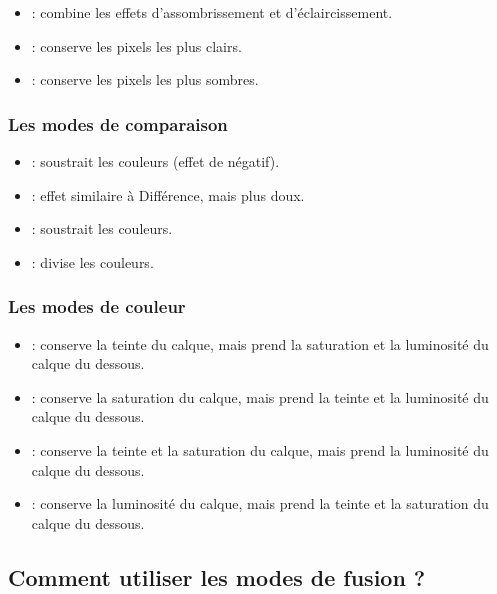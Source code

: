 \begin{itemize}
    \item {} : combine les effets d'assombrissement et d'éclaircissement.
    \item {} : conserve les pixels les plus clairs.
    \item {} : conserve les pixels les plus sombres.
\end{itemize}

\subsubsection{Les modes de comparaison}

\begin{itemize}
    \item {} : soustrait les couleurs (effet de négatif).
    \item {} : effet similaire à Différence, mais plus doux.
    \item {} : soustrait les couleurs.
    \item {} : divise les couleurs.
\end{itemize}

\subsubsection{Les modes de couleur}

\begin{itemize}
    \item {} : conserve la teinte du calque, mais prend la saturation et la luminosité du calque du dessous.
    \item {} : conserve la saturation du calque, mais prend la teinte et la luminosité du calque du dessous.
    \item {} : conserve la teinte et la saturation du calque, mais prend la luminosité du calque du dessous.
    \item {} : conserve la luminosité du calque, mais prend la teinte et la saturation du calque du dessous.
\end{itemize}

\subsection{Comment utiliser les modes de fusion ?}

